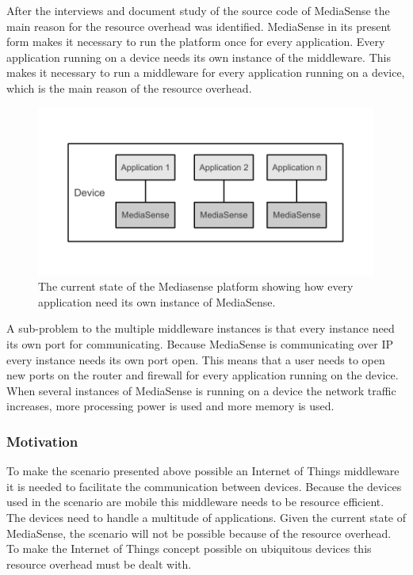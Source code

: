 After the interviews and document study of the source code of MediaSense the main reason for the resource overhead was identified. MediaSense in its present form makes it necessary to run the platform once for every application. Every application running on a device needs its own instance of the middleware. This makes it necessary to run a middleware for every application running on a device, which is the main reason of the resource overhead. 

\begin{figure}[h!]
		\centering
    	\includegraphics{part_4/result_and_analysis/mediasense_arch_old.pdf}
		\caption{The current state of the Mediasense platform showing how every application need its own instance of MediaSense.} 
\end{figure}

A sub-problem to the multiple middleware instances is that every instance need its own port for communicating. Because MediaSense is communicating over IP every instance needs its own port open. This means that a user needs to open new ports on the router and firewall for every application running on the device. When several instances of MediaSense is running on a device the network traffic increases, more processing power is used and more memory is used. 

\subsubsection{Motivation}
To make the scenario presented above possible an Internet of Things middleware it is needed to facilitate the communication between devices. Because the devices used in the scenario are mobile this middleware needs to be resource efficient. The devices need to handle a multitude of applications. Given the current state of MediaSense, the scenario will not be possible because of the resource overhead. To make the Internet of Things concept possible on ubiquitous devices this resource overhead must be dealt with.

